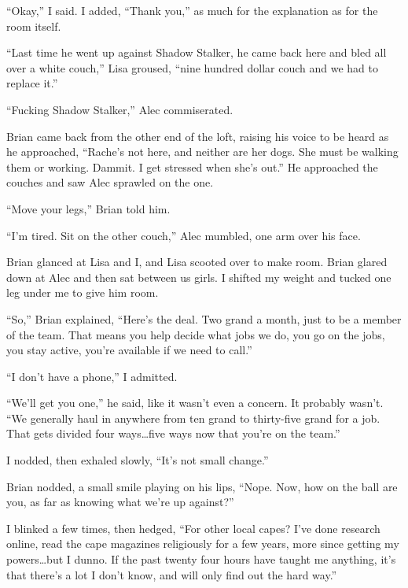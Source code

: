 ``Okay,'' I said.  I added, ``Thank you,'' as much for the explanation as for the room itself.



``Last time he went up against Shadow Stalker, he came back here and bled all over a white couch,'' Lisa groused, ``nine hundred dollar couch and we had to replace it.''



``Fucking Shadow Stalker,'' Alec commiserated.



Brian came back from the other end of the loft, raising his voice to be heard as he approached, ``Rache's not here, and neither are her dogs.  She must be walking them or working.  Dammit.  I get stressed when she's out.''  He approached the couches and saw Alec sprawled on the one.



``Move your legs,'' Brian told him.



``I'm tired.  Sit on the other couch,'' Alec mumbled, one arm over his face.



Brian glanced at Lisa and I, and Lisa scooted over to make room.  Brian glared down at Alec and then sat between us girls.  I shifted my weight and tucked one leg under me to give him room.



``So,'' Brian explained, ``Here's the deal.  Two grand a month, just to be a member of the team.  That means you help decide what jobs we do, you go on the jobs, you stay active, you're available if we need to call.''



``I don't have a phone,'' I admitted.



``We'll get you one,'' he said, like it wasn't even a concern.  It probably wasn't. ``We generally haul in anywhere from ten grand to thirty-five grand for a job.  That gets divided four ways\ldots five ways now that you're on the team.''



I nodded, then exhaled slowly, ``It's not small change.''



Brian nodded, a small smile playing on his lips, ``Nope.  Now, how on the ball are you, as far as knowing what we're up against?''



I blinked a few times, then hedged, ``For other local capes?  I've done research online, read the cape magazines religiously for a few years, more since getting my powers\ldots but I dunno.  If the past twenty four hours have taught me anything, it's that there's a lot I don't know, and will only find out the hard way.''



